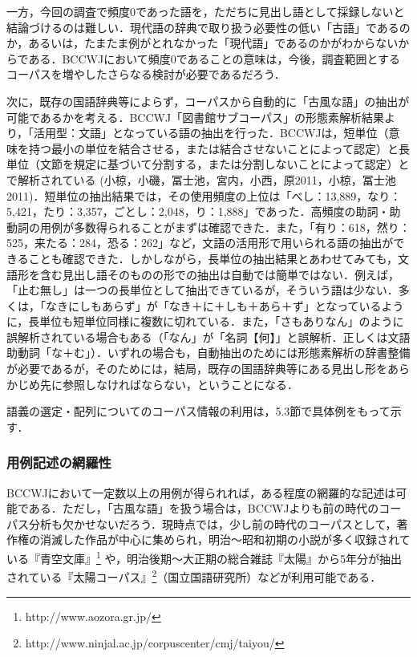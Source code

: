 \documentclass[japanese]{jnlp_1.4}
\begin{document}
一方，今回の調査で頻度0であった語を，ただちに見出し語として採録しないと結論づけるのは難しい．現代語の辞典で取り扱う必要性の低い「古語」であるのか，あるいは，たまたま例がとれなかった「現代語」であるのかがわからないからである．BCCWJにおいて頻度0であることの意味は，今後，調査範囲とするコーパスを増やしたさらなる検討が必要であるだろう．

次に，既存の国語辞典等によらず，コーパスから自動的に「古風な語」の抽出が可能であるかを考える．BCCWJ「図書館サブコーパス」の形態素解析結果より，「活用型：文語」となっている語の抽出を行った．BCCWJは，短単位（意味を持つ最小の単位を結合させる，または結合させないことによって認定）と長単位（文節を規定に基づいて分割する，または分割しないことによって認定）とで解析されている (小椋，小磯，冨士池，宮内，小西，原2011，小椋，冨士池2011)．短単位の抽出結果では，その使用頻度の上位は「べし：13,889，なり：5,421，たり：3,357，ごとし：2,048，り：1,888」であった．高頻度の助詞・助動詞の用例が多数得られることがまずは確認できた．また，「有り：618，然り：525，来たる：284，恐る：262」など，文語の活用形で用いられる語の抽出ができることも確認できた．しかしながら，長単位の抽出結果とあわせてみても，文語形を含む見出し語そのものの形での抽出は自動では簡単ではない．例えば，「止む無し」は一つの長単位として抽出できているが，そういう語は少ない．多くは，「なきにしもあらず」が「なき＋に＋しも＋あら＋ず」となっているように，長単位も短単位同様に複数に切れている．また，「さもありなん」のように誤解析されている場合もある（「なん」が「名詞【何】」と誤解析．正しくは文語助動詞「な＋む」）．いずれの場合も，自動抽出のためには形態素解析の辞書整備が必要であるが，そのためには，結局，既存の国語辞典等にある見出し形をあらかじめ先に参照しなければならない，ということになる．

語義の選定・配列についてのコーパス情報の利用は，5.3節で具体例をもって示す．


\subsubsection{用例記述の網羅性}

BCCWJにおいて一定数以上の用例が得られれば，ある程度の網羅的な記述は可能である．ただし，「古風な語」を扱う場合は，BCCWJよりも前の時代のコーパス分析も欠かせないだろう．現時点では，少し前の時代のコーパスとして，著作権の消滅した作品が中心に集められ，明治〜昭和初期の小説が多く収録されている『青空文庫』\footnote{http://www.aozora.gr.jp/} や，明治後期〜大正期の総合雑誌『太陽』から5年分が抽出されている『太陽コーパス』\footnote{http://www.ninjal.ac.jp/corpus\textunderscore center/cmj/taiyou/}（国立国語研究所）などが利用可能である．
\end{document}
